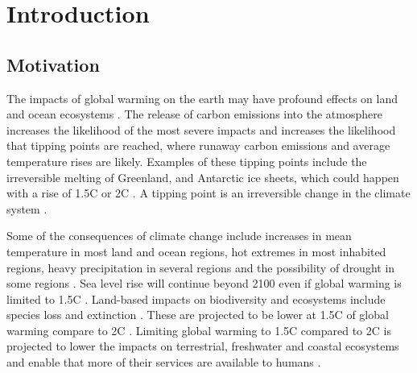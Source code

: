 
\chapter{Introduction}  %
\label{chapter:intro}


\ifpdf
\graphicspath{{Chapter1/Figs/Raster/}{Chapter1/Figs/PDF/}{Chapter1/Figs/}}
\else
\graphicspath{{Chapter1/Figs/Vector/}{Chapter1/Figs/}}
\fi


\section{Motivation} %


The impacts of global warming on the earth may have profound effects on land and ocean ecosystems \cite{IPCC2018}. The release of carbon emissions into the atmosphere increases the likelihood of the most severe impacts and increases the likelihood that tipping points are reached, where runaway carbon emissions and average temperature rises are likely. Examples of these tipping points include the irreversible melting of Greenland, and Antarctic ice sheets, which could happen with a rise of 1.5\degree C or 2\degree C \cite{IPCC2018}. A tipping point is an irreversible change in the climate system \cite{IPCC2018}.

Some of the consequences of climate change include increases in mean temperature in most land and ocean regions, hot extremes in most inhabited regions, heavy precipitation in several regions and the possibility of drought in some regions \cite{IPCC2018}. Sea level rise will continue beyond 2100 even if global warming is limited to 1.5\degree C \cite{IPCC2018}. Land-based impacts on biodiversity and ecosystems include species loss and extinction \cite{IPCC2018}. These are projected to be lower at 1.5\degree C of global warming compare to 2\degree C \cite{IPCC2018}. Limiting global warming to 1.5\degree C compared to 2\degree C is projected to lower the impacts on terrestrial, freshwater and coastal ecosystems and enable that more of their services are available to humans \cite{IPCC2018}.

